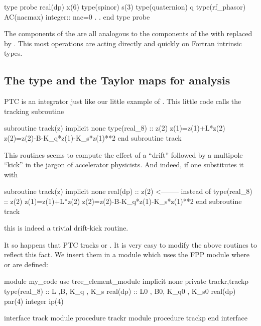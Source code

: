 \documentclass[english,12pt,article]{article} %
\begin{document}
{      \begin{example}
  type probe
     real(dp) x(6)
     type(spinor) s(3)
     type(quaternion) q
     type(rf_phasor)  AC(nacmax)
     integer:: nac=0
       .
       .
  end type probe
      \end{example}
      
      The components of the  are all analogous to the components of the  with  replaced by . This most operations are acting directly and quickly on Fortran intrinsic types.
      
 \subsection{The type {}  and the Taylor maps  {}   for analysis}
 
   PTC is an integrator  just like our little example of . This little code  calls the tracking subroutine 
   \begin{code}
      subroutine track(z)
      implicit none
      type(real_8) :: z(2) 
       z(1)=z(1)+L*z(2) 
       z(2)=z(2)-B-K_q*z(1)-K_s*z(1)**2 
      end subroutine track
    \end{code}

This routines seems to compute the effect of a ``drift'' followed by a multipole ``kick'' in the jargon of accelerator physicists.  And indeed, if one substitutes it with 
   \begin{code}
      subroutine track(z)
      implicit none
      real(dp) :: z(2)            <-------- instead of type(real_8) :: z(2) 
       z(1)=z(1)+L*z(2) 
       z(2)=z(2)-B-K_q*z(1)-K_s*z(1)**2 
      end subroutine track
    \end{code}
   this is indeed a trivial  drift-kick routine.   
    
It so happens that PTC tracks  or  .  It is very easy to modify the above routines to reflect this fact. We insert them in a module which  uses the FPP
module   where   or   are defined:

   \begin{code}
      module my_code
      use tree_element_module
      implicit none
      private trackr,trackp
      type(real_8)  :: L ,B, K_q , K_s 
      real(dp) :: L0 , B0, K_q0 , K_s0 
      real(dp) par(4)
      integer ip(4)
      
      interface track
       module procedure trackr
       module procedure trackp 
      end interface
      

\end{code}}
\end{document}
